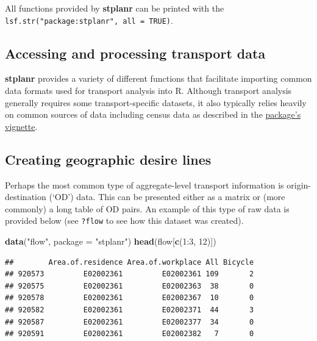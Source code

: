 \documentclass[11pt]{article}
\newenvironment{Shaded}{\begin{snugshade}}{\end{snugshade}}
\newcommand{\KeywordTok}[1]{\textcolor[rgb]{0.13,0.29,0.53}{\textbf{{#1}}}}
\newcommand{\DataTypeTok}[1]{\textcolor[rgb]{0.13,0.29,0.53}{{#1}}}
\newcommand{\DecValTok}[1]{\textcolor[rgb]{0.00,0.00,0.81}{{#1}}}
\newcommand{\StringTok}[1]{\textcolor[rgb]{0.31,0.60,0.02}{{#1}}}
\newcommand{\NormalTok}[1]{{#1}}
\begin{document}
All functions provided by \textbf{stplanr} can be printed with the
\texttt{lsf.str("package:stplanr",\ all\ =\ TRUE)}.

\subsection{Accessing and processing transport
data}\label{accessing-and-processing-transport-data}

\textbf{stplanr} provides a variety of different functions that
facilitate importing common data formats used for transport analysis
into R. Although transport analysis generally requires some
transport-specific datasets, it also typically relies heavily on common
sources of data including census data as described in the
\href{https://github.com/ropensci/stplanr/blob/master/vignettes/stplanr-paper.Rmd}{package's
vignette}.

\subsection{Creating geographic desire
lines}\label{creating-geographic-desire-lines}

Perhaps the most common type of aggregate-level transport information is
origin-destination (`OD') data. This can be presented either as a matrix
or (more commonly) a long table of OD pairs. An example of this type of
raw data is provided below (see \texttt{?flow} to see how this dataset
was created).

\begin{Shaded}
\begin{Highlighting}[]
\KeywordTok{data}\NormalTok{(}\StringTok{"flow"}\NormalTok{, }\DataTypeTok{package =} \StringTok{"stplanr"}\NormalTok{)}
\KeywordTok{head}\NormalTok{(flow[}\KeywordTok{c}\NormalTok{(}\DecValTok{1}\NormalTok{:}\DecValTok{3}\NormalTok{, }\DecValTok{12}\NormalTok{)])}
\end{Highlighting}
\end{Shaded}

\begin{verbatim}
##        Area.of.residence Area.of.workplace All Bicycle
## 920573         E02002361         E02002361 109       2
## 920575         E02002361         E02002363  38       0
## 920578         E02002361         E02002367  10       0
## 920582         E02002361         E02002371  44       3
## 920587         E02002361         E02002377  34       0
## 920591         E02002361         E02002382   7       0
\end{verbatim}
\end{document}
